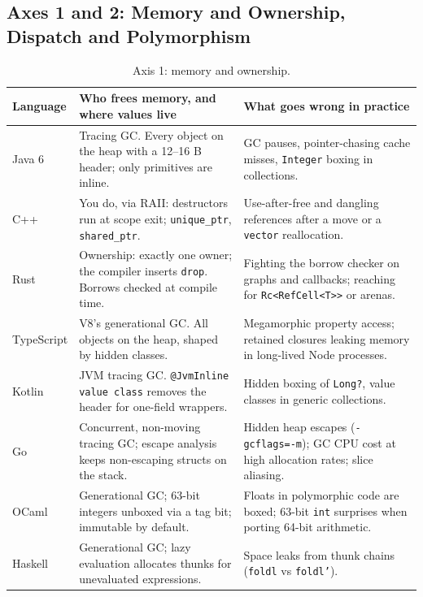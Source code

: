 \subsection{Axes 1 and 2: Memory and Ownership, Dispatch and Polymorphism}

\begin{table}[H]
\centering
\small
\begin{tabular}{@{}p{1.9cm}p{6.1cm}p{6.3cm}@{}}
\toprule
\textbf{Language} & \textbf{Who frees memory, and where values live} & \textbf{What goes wrong in practice} \\
\midrule
Java 6 & Tracing GC. Every object on the heap with a 12--16 B header; only primitives are inline. & GC pauses, pointer-chasing cache misses, \texttt{Integer} boxing in collections. \\
C++ & You do, via RAII: destructors run at scope exit; \texttt{unique\_ptr}, \texttt{shared\_ptr}. & Use-after-free and dangling references after a move or a \texttt{vector} reallocation. \\
Rust & Ownership: exactly one owner; the compiler inserts \texttt{drop}. Borrows checked at compile time. & Fighting the borrow checker on graphs and callbacks; reaching for \texttt{Rc<RefCell<T>>} or arenas. \\
TypeScript & V8's generational GC. All objects on the heap, shaped by hidden classes. & Megamorphic property access; retained closures leaking memory in long-lived Node processes. \\
Kotlin & JVM tracing GC. \texttt{@JvmInline value class} removes the header for one-field wrappers. & Hidden boxing of \texttt{Long?}, value classes in generic collections. \\
Go & Concurrent, non-moving tracing GC; escape analysis keeps non-escaping structs on the stack. & Hidden heap escapes (\texttt{-gcflags=-m}); GC CPU cost at high allocation rates; slice aliasing. \\
OCaml & Generational GC; 63-bit integers unboxed via a tag bit; immutable by default. & Floats in polymorphic code are boxed; 63-bit \texttt{int} surprises when porting 64-bit arithmetic. \\
Haskell & Generational GC; lazy evaluation allocates thunks for unevaluated expressions. & Space leaks from thunk chains (\texttt{foldl} vs \texttt{foldl'}). \\
\bottomrule
\end{tabular}
\caption{Axis 1: memory and ownership.}
\label{ch11:tab-memory}
\end{table}

